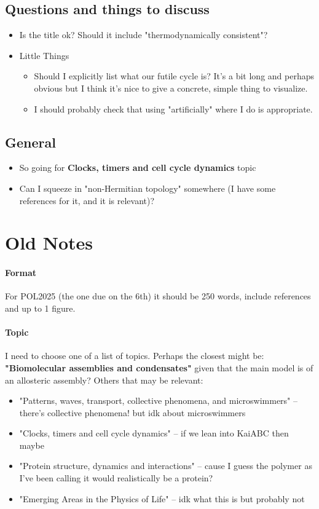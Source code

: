 \documentclass[11pt]{article}
\begin{document}
\subsection{Questions and things to discuss}
\begin{itemize}
	\item Is the title ok? Should it include "thermodynamically consistent"?
	\item Little Things \begin{itemize}
		      \item Should I explicitly list what our futile cycle is? It's a bit long and perhaps obvious but I think it's nice to give a concrete, simple thing to visualize.
              \item I should probably check that using "artificially" where I do is appropriate.
	      \end{itemize}
\end{itemize}

\subsection{General}
\begin{itemize}
	\item So going for \textbf{Clocks, timers and cell cycle dynamics} topic
	\item Can I squeeze in "non-Hermitian topology" somewhere (I have some references for it, and it is relevant)?
\end{itemize}

\newpage
\section{Old Notes}
\paragraph{Format}
For POL2025 (the one due on the 6th) it should be 250 words, include references and up to 1 figure.
\paragraph{Topic}
I need to choose one of a list of topics.
Perhaps the closest might be: \textbf{"Biomolecular assemblies and condensates"} given that the main model is of an allosteric assembly?
Others that may be relevant:
\begin{itemize}
	\item "Patterns, waves, transport, collective phenomena, and microswimmers" -- there's collective phenomena! but idk about microswimmers
	\item "Clocks, timers and cell cycle dynamics" -- if we lean into KaiABC then maybe
	\item "Protein structure, dynamics and interactions" -- cause I guess the polymer as I've been calling it would realistically be a protein?
	\item "Emerging Areas in the Physics of Life" -- idk what this is but probably not
\end{itemize}
\end{document}
